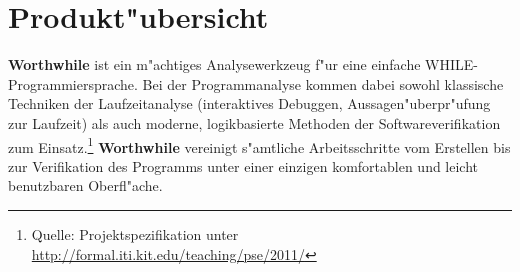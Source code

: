 \section{Produkt"ubersicht}%

\textbf{Worthwhile} ist ein m"achtiges Analysewerkzeug f"ur eine einfache WHILE-Programmiersprache. Bei der Programmanalyse kommen dabei sowohl klassische Techniken der Laufzeitanalyse (interaktives Debuggen, Aussagen"uberpr"ufung zur Laufzeit) als auch moderne, logikbasierte Methoden der Softwareverifikation zum Einsatz.\footnote{Quelle: Projektspezifikation unter \url{http://formal.iti.kit.edu/teaching/pse/2011/}} \textbf{Worthwhile} vereinigt s"amtliche Arbeitsschritte vom Erstellen bis zur Verifikation des Programms unter einer einzigen komfortablen und leicht benutzbaren Oberfl"ache.%
